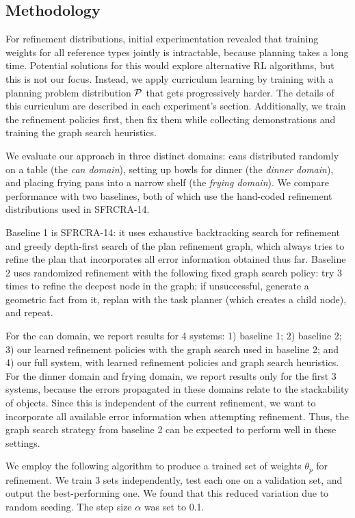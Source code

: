\subsection{Methodology}
For refinement distributions, initial experimentation revealed that training weights for all reference types jointly is intractable,
because planning takes a long time. Potential solutions for this would explore alternative RL algorithms,
but this is not our focus. Instead, we apply curriculum learning by training with a planning problem distribution
$\mathcal{P}$ that gets progressively harder. The details of this curriculum are described in each experiment's section.
Additionally, we train the refinement policies first, then fix them while collecting demonstrations and training the graph search heuristics.

We evaluate our approach in three distinct domains: cans distributed randomly on a table (the \emph{can domain}),
setting up bowls for dinner (the \emph{dinner domain}), and placing frying pans into a narrow shelf (the \emph{frying domain}).
We compare performance with two baselines, both of which use the hand-coded refinement distributions used in SFRCRA-14.

Baseline 1 is SFRCRA-14: it uses exhaustive backtracking search for refinement
and greedy depth-first search of the plan refinement graph, which always tries to refine
the plan that incorporates all error information obtained thus far.
Baseline 2 uses randomized refinement with the following fixed graph search policy: try 3 times to refine the deepest
node in the graph; if unsuccessful, generate a geometric fact from it, replan with the task planner (which creates a child node), and repeat.

For the can domain, we report results for 4 systems: 1) baseline 1; 2) baseline 2; 3) our learned refinement policies
with the graph search used in baseline 2; and 4) our full system, with learned refinement policies and graph search heuristics.
For the dinner domain and frying domain, we report results only for the first 3 systems, because the errors propagated in these
domains relate to the stackability of objects. Since this is independent of the current refinement, we want to
incorporate all available error information when attempting refinement. Thus, the graph search strategy
from baseline 2 can be expected to perform well in these settings.

We employ the following algorithm to produce a trained set of weights $\theta_{p}$ for refinement. We train 3 sets independently,
test each one on a validation set, and output the best-performing one. We found that this
reduced variation due to random seeding. The step size $\alpha$ was set to 0.1.

